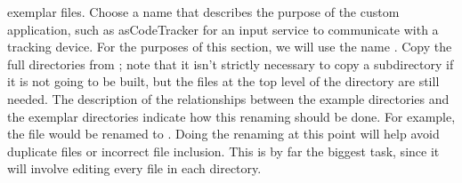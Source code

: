exemplar files.
Choose a name that describes the purpose of the custom application, such as
asCode{Tracker} for an input service to communicate with a tracking device.
For the purposes of this section, we will use the name .
\tertiaryEnd{}
Copy the full directories from ; note that it isn't strictly necessary
to copy a subdirectory if it is not going to be built, but the files at the top level of
the directory are still needed.
\tertiaryEnd{}
The description of the relationships between the example directories and the exemplar
directories indicate how this renaming should be done.
For example, the file  would be renamed to
.
Doing the renaming at this point will help avoid duplicate files or incorrect file
inclusion.
\tertiaryEnd{}
This is by far the biggest task, since it will involve editing every file in each
directory.
